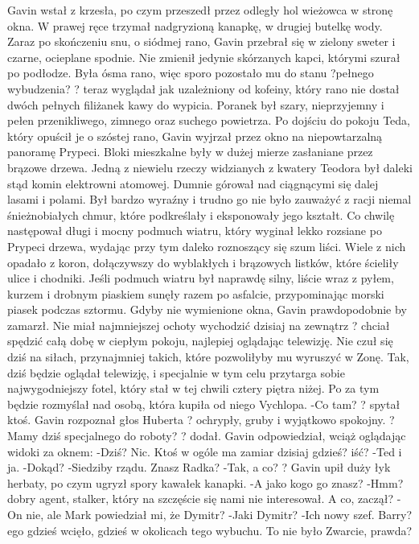 \documentclass[../MAIN.tex]{subfiles}
\begin{document}
Gavin wstał z krzesła, po czym przeszedł przez odległy hol wieżowca w stronę okna. W prawej ręce trzymał nadgryzioną kanapkę, w drugiej butelkę wody.
Zaraz po skończeniu snu, o siódmej rano, Gavin przebrał się w zielony sweter i czarne, ocieplane spodnie. Nie zmienił jedynie skórzanych kapci, którymi szurał po podłodze. Była ósma rano, więc sporo pozostało mu do stanu ?pełnego wybudzenia? ? teraz wyglądał jak uzależniony od kofeiny, który rano nie dostał dwóch pełnych filiżanek kawy do wypicia. Poranek był szary, nieprzyjemny i pełen przenikliwego, zimnego oraz suchego powietrza.
Po dojściu do pokoju Teda, który opuścił je o szóstej rano, Gavin wyjrzał przez okno na niepowtarzalną panoramę Prypeci.
Bloki mieszkalne były w dużej mierze zasłaniane przez brązowe drzewa. Jedną z niewielu rzeczy widzianych z kwatery Teodora był daleki stąd komin elektrowni atomowej. Dumnie górował nad ciągnącymi się dalej lasami i polami. Był bardzo wyraźny i trudno go nie było zauważyć z racji niemal śnieżnobiałych chmur, które podkreślały i eksponowały jego kształt.
Co chwilę następował długi i mocny podmuch wiatru, który wyginał lekko rozsiane po Prypeci drzewa, wydając przy tym daleko roznoszący się szum liści. Wiele z nich opadało z koron, dołączywszy do wyblakłych i brązowych listków, które ścieliły ulice i chodniki. Jeśli podmuch wiatru był naprawdę silny, liście wraz z pyłem, kurzem i drobnym piaskiem sunęły razem po asfalcie, przypominając morski piasek podczas sztormu.
Gdyby nie wymienione okna, Gavin prawdopodobnie by zamarzł. Nie miał najmniejszej ochoty wychodzić dzisiaj na zewnątrz ? chciał spędzić całą dobę w ciepłym pokoju, najlepiej oglądając telewizję. Nie czuł się dziś na siłach, przynajmniej takich, które pozwoliłyby mu wyruszyć w Zonę.
Tak, dziś będzie oglądał telewizję, i specjalnie w tym celu przytarga sobie najwygodniejszy fotel, który stał w tej chwili cztery piętra niżej. Po za tym będzie rozmyślał nad osobą, która kupiła od niego Vychlopa.
-Co tam? ? spytał ktoś. Gavin rozpoznał głos Huberta ? ochrypły, gruby i wyjątkowo spokojny. ? Mamy dziś specjalnego do roboty? ? dodał.
Gavin odpowiedział, wciąż oglądając widoki za oknem:
-Dziś? Nic. Ktoś w ogóle ma zamiar dzisiaj gdzieś? iść?
-Ted i ja.
-Dokąd?
-Siedziby rządu. Znasz Radka?
-Tak, a co? ? Gavin upił duży łyk herbaty, po czym ugryzł spory kawałek kanapki.
-A jako kogo go znasz?
-Hmm? dobry agent, stalker, który na szczęście się nami nie interesował. A co, zaczął?
-On nie, ale Mark powiedział mi, że Dymitr?
-Jaki Dymitr?
-Ich nowy szef. Barry?ego gdzieś wcięło, gdzieś w okolicach tego wybuchu. To nie było Zwarcie, prawda?
\end{document}
